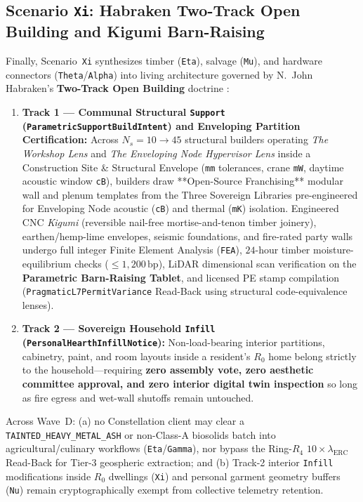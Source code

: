 \subsection{Scenario \texttt{Xi}: Habraken Two-Track Open Building and Kigumi Barn-Raising}

Finally, Scenario~\texttt{Xi} synthesizes timber (\texttt{Eta}), salvage (\texttt{Mu}), and hardware connectors (\texttt{Theta}/\texttt{Alpha}) into living architecture governed by N.\ John Habraken's \textbf{Two-Track Open Building} doctrine \parencite{habraken1972supports}:
\begin{enumerate}
    \item \textbf{Track 1 --- Communal Structural \texttt{Support} (\texttt{ParametricSupportBuildIntent}) and Enveloping Partition Certification:} Across $N_s = 10 \to 45$ structural builders operating \textit{The Workshop Lens} and \textit{The Enveloping Node Hypervisor Lens} inside a Construction Site \& Structural Envelope (\texttt{mm} tolerances, crane \texttt{mW}, daytime acoustic window \texttt{cB}), builders draw **Open-Source Franchising** modular wall and plenum templates from the Three Sovereign Libraries pre-engineered for Enveloping Node acoustic (\texttt{cB}) and thermal (\texttt{mK}) isolation. Engineered CNC \textit{Kigumi} (reversible nail-free mortise-and-tenon timber joinery), earthen/hemp-lime envelopes, seismic foundations, and fire-rated party walls undergo full integer Finite Element Analysis (\texttt{FEA}), $24$-hour timber moisture-equilibrium checks ($\le 1{,}200\,\mathrm{bp}$), LiDAR dimensional scan verification on the \textbf{Parametric Barn-Raising Tablet}, and licensed PE stamp compilation (\texttt{PragmaticL7PermitVariance} Read-Back using structural code-equivalence lenses).
    \item \textbf{Track 2 --- Sovereign Household \texttt{Infill} (\texttt{PersonalHearthInfillNotice}):} Non-load-bearing interior partitions, cabinetry, paint, and room layouts inside a resident's $R_0$ home belong strictly to the household---requiring \textbf{zero assembly vote, zero aesthetic committee approval, and zero interior digital twin inspection} so long as fire egress and wet-wall shutoffs remain untouched.
\end{enumerate}

\begin{invariant}
\label{inv:wave-d-taint-habraken}
Across Wave~D: (a) no Constellation client may clear a \texttt{TAINTED\_HEAVY\_METAL\_ASH} or non-Class-A biosolids batch into agricultural/culinary workflows (\texttt{Eta}/\texttt{Gamma}), nor bypass the Ring-$R_4$ $10\times\lambda_{\mathrm{ERC}}$ Read-Back for Tier-3 geospheric extraction; and (b) Track-2 interior \texttt{Infill} modifications inside $R_0$ dwellings (\texttt{Xi}) and personal garment geometry buffers (\texttt{Nu}) remain cryptographically exempt from collective telemetry retention.
\end{invariant}

